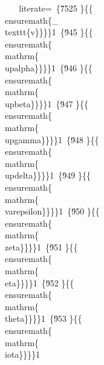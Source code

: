 {%
\
\
literate=\
\{\u7525 \}\{\{\\ensuremath\{_\\texttt\{v\}\}\}\}1\
\{\u945 \}\{\{\\ensuremath\{\\mathrm\{\\upalpha\}\}\}\}1\
\{\u946 \}\{\{\\ensuremath\{\\mathrm\{\\upbeta\}\}\}\}1\
\{\u947 \}\{\{\\ensuremath\{\\mathrm\{\\upgamma\}\}\}\}1\
\{\u948 \}\{\{\\ensuremath\{\\mathrm\{\\updelta\}\}\}\}1\
\{\u949 \}\{\{\\ensuremath\{\\mathrm\{\\varepsilon\}\}\}\}1\
\{\u950 \}\{\{\\ensuremath\{\\mathrm\{\\zeta\}\}\}\}1\
\{\u951 \}\{\{\\ensuremath\{\\mathrm\{\\eta\}\}\}\}1\
\{\u952 \}\{\{\\ensuremath\{\\mathrm\{\\theta\}\}\}\}1\
\{\u953 \}\{\{\\ensuremath\{\\mathrm\{\\iota\}\}\}\}1\
}
